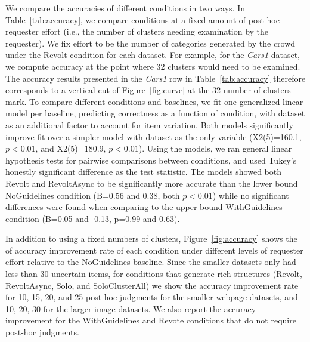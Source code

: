We compare the accuracies of different conditions in two ways. In Table~\ref{tab:accuracy}, we compare conditions at a fixed amount of post-hoc requester effort (i.e., the number of clusters needing examination by the requester). We fix effort to be the number of categories generated by the crowd under the Revolt condition for each dataset. For example, for the \emph{Cars1} dataset, we compute accuracy at the point where 32 clusters would need to be examined. The accuracy results presented in the \emph{Cars1} row in Table~\ref{tab:accuracy} therefore corresponds to a vertical cut of Figure~\ref{fig:curve} at the 32 number of clusters mark. To compare different conditions and baselines, we fit one generalized linear model per baseline, predicting correctness as a function of condition, with dataset as an additional factor to account for item variation. Both models significantly improve fit over a simpler model with dataset
as the only variable (X2(5)=160.1, $p<0.01$, and X2(5)=180.9,
$p<0.01$). 
Using the models, we ran general linear hypothesis tests for pairwise comparisons between conditions, and used Tukey's honestly significant difference as the test statistic. 
The models showed both Revolt and RevoltAsync to be significantly more accurate than the lower bound NoGuidelines condition (B=0.56 and 0.38, both $p<0.01$) while no significant differences were found when comparing to the upper bound WithGuidelines condition (B=0.05 and -0.13, p=0.99 and 0.63).


In addition to using a fixed numbers of clusters, Figure~\ref{fig:accuracy} shows the of accuracy improvement rate of each condition under different levels of requester effort relative to the NoGuidelines baseline. Since the smaller datasets only had less than 30 uncertain items, for conditions that generate rich structures (Revolt, RevoltAsync, Solo, and SoloClusterAll) we show the accuracy improvement rate for 10, 15, 20, and 25 post-hoc judgments for the smaller webpage datasets, and 10, 20, 30 for the larger image datasets. We also report the accuracy improvement for the WithGuidelines and Revote conditions that do not require post-hoc judgments. 






